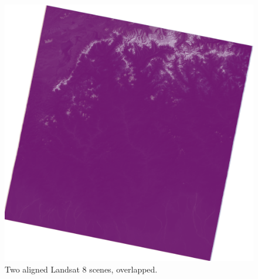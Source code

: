 \documentclass[12pt, a4paper]{report}
\begin{document}
\begin{figure}[H]
  		\endminipage\hfill
  		\includegraphics[width=\linewidth]{purple_big_aligned.png}
  		\endminipage
  		\caption{Two aligned Landsat 8 scenes, overlapped.}\label{fig:big_aligned}
  	\end{figure}
  	
\end{document}
